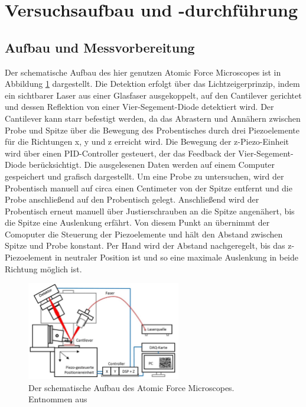 \newpage
\section{Versuchsaufbau und -durchführung}
  \subsection{Aufbau und Messvorbereitung}
    Der schematische Aufbau des hier genutzen Atomic Force Microscopes ist in Abbildung \ref{fig:Aufbau} dargestellt. Die Detektion erfolgt über das Lichtzeigerprinzip, indem ein sichtbarer Laser
    aus einer Glasfaser ausgekoppelt, auf den Cantilever gerichtet und dessen Reflektion von einer Vier-Segement-Diode detektiert wird. Der Cantilever kann starr befestigt werden, da das Abrastern und 
    Annähern zwischen Probe und Spitze über die Bewegung des Probentisches durch drei Piezoelemente für die Richtungen x, y und z erreicht wird. Die Bewegung der z-Piezo-Einheit wird über einen 
    PID-Controller gesteuert, der das Feedback der Vier-Segement-Diode berücksichtigt. Die ausgelesenen Daten werden auf einem Computer gespeichert und grafisch dargestellt.
    Um eine Probe zu untersuchen, wird der Probentisch manuell auf circa einen Centimeter von der Spitze entfernt und die Probe anschließend auf den Probentisch gelegt. Anschließend wird der Probentisch
    erneut manuell über Justierschrauben an die Spitze angenähert, bis die Spitze eine Auslenkung erfährt. Von diesem Punkt an übernimmt der Comoputer die Steuerung der Piezoelemente und hält den Abstand 
    zwischen Spitze und Probe konstant. Per Hand wird der Abstand nachgeregelt, bis das z-Piezoelement in neutraler Position ist und so eine maximale Auslenkung in beide Richtung möglich ist.
    \FloatBarrier
    \begin{figure}[h]
      \centering
      \includegraphics[width = 0.6\textwidth]{pictures/Aufbau.png}
      \caption{Der schematische Aufbau des Atomic Force Microscopes. Entnommen aus \cite{tu_dortmund_versuchsanleitung_nodate}}
      \label{fig:Aufbau}
    \end{figure}
    \FloatBarrier

